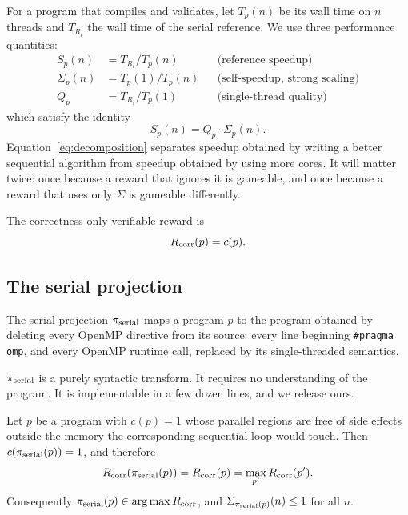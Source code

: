 For a program that compiles and validates, let $T_p(n)$ be its wall time on
$n$ threads and $T_{R_t}$ the wall time of the serial reference. We use three
performance quantities:
\begin{align}
  S_p(n) &= T_{R_t}/T_p(n) && \text{(reference speedup)}\\
  \Sigma_p(n) &= T_p(1)/T_p(n) && \text{(self-speedup, strong scaling)}\\
  Q_p &= T_{R_t}/T_p(1) && \text{(single-thread quality)}
\end{align}
which satisfy the identity
\begin{equation}
  S_p(n) = Q_p \cdot \Sigma_p(n).
  \label{eq:decomposition}
\end{equation}
Equation~\eqref{eq:decomposition} separates speedup obtained by writing a
better sequential algorithm from speedup obtained by using more cores. It will
matter twice: once because a reward that ignores it is gameable, and once
because a reward that uses only $\Sigma$ is gameable differently.

The correctness-only verifiable reward is
\begin{equation}
  R_{\mathrm{corr}}(p) = c(p).
  \label{eq:rcorr}
\end{equation}

\subsection{The serial projection}

\begin{definition}
\label{def:projection}
The serial projection $\pi_{\mathrm{serial}}$ maps a program $p$ to the program obtained
by deleting every OpenMP directive from its source: every line beginning
\texttt{\#pragma omp}, and every OpenMP runtime call, replaced by its
single-threaded semantics.
\end{definition}

$\pi_{\mathrm{serial}}$ is a purely syntactic transform. It requires no understanding of
the program. It is implementable in a few dozen lines, and we release ours.

\begin{proposition}
\label{prop:degeneracy}
Let $p$ be a program with $c(p)=1$ whose parallel regions are free of
side effects outside the memory the corresponding sequential loop would touch.
Then $c(\pi_{\mathrm{serial}}(p)) = 1$, and therefore
\begin{equation*}
  R_{\mathrm{corr}}(\pi_{\mathrm{serial}}(p)) = R_{\mathrm{corr}}(p) = \max_{p'} R_{\mathrm{corr}}(p').
\end{equation*}
Consequently $\pi_{\mathrm{serial}}(p) \in \arg\max R_{\mathrm{corr}}$, and
$\Sigma_{\pi_{\mathrm{serial}}(p)}(n) \le 1$ for all $n$.
\end{proposition}

